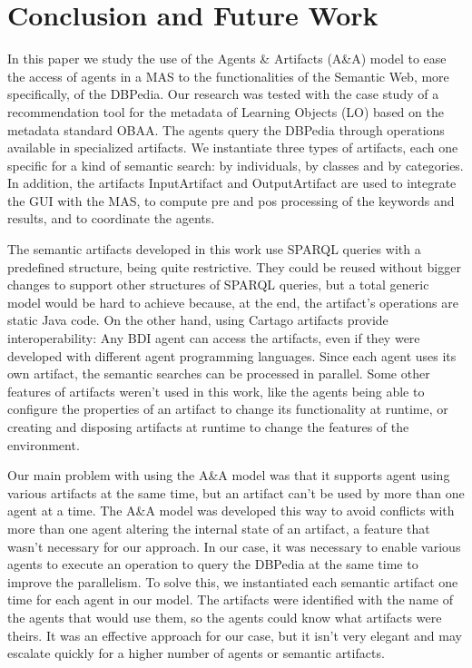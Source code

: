 \documentclass[a4paper,twoside]{article}
\begin{document}
\section{Conclusion and Future Work}

\noindent In this paper we study the use of the Agents \& Artifacts (A\&A) model to ease the access of agents in a MAS to the functionalities of the Semantic Web, more specifically, of the DBPedia. Our research was tested with the case study of a recommendation tool for the metadata of Learning Objects (LO) based on the metadata standard OBAA. The agents query the DBPedia through operations available in specialized artifacts. We instantiate three types of artifacts, each one specific for a kind of semantic search: by individuals, by classes and by categories. In addition, the artifacts InputArtifact and OutputArtifact are used to integrate the GUI with the MAS, to compute pre and pos processing of the keywords and results, and to coordinate the agents.

The semantic artifacts developed in this work use SPARQL queries with a predefined structure, being quite restrictive. They could be reused without bigger changes to support other structures of SPARQL queries, but a total generic model would be hard to achieve because, at the end, the artifact's operations are static Java code. On the other hand, using Cartago artifacts provide interoperability: Any BDI agent can access the artifacts, even if they were developed with different agent programming languages. Since each agent uses its own artifact, the semantic searches can be processed in parallel. Some other features of artifacts weren't used in this work, like the agents being able to configure the properties of an artifact to change its functionality at runtime, or creating and disposing artifacts at runtime to change the features of the environment.

Our main problem with using the A\&A model was that it supports agent using various artifacts at the same time, but an artifact can't be used by more than one agent at a time. The A\&A model was developed this way to avoid conflicts with more than one agent altering the internal state of an artifact, a feature that wasn't necessary for our approach. In our case, it was necessary to enable various agents to execute an operation to query the DBPedia at the same time to improve the parallelism. To solve this, we instantiated each semantic artifact one time for each agent in our model. The artifacts were identified with the name of the agents that would use them, so the agents could know what artifacts were theirs. It was an effective approach for our case, but it isn't very elegant and may escalate quickly for a higher number of agents or semantic artifacts.
\end{document}
